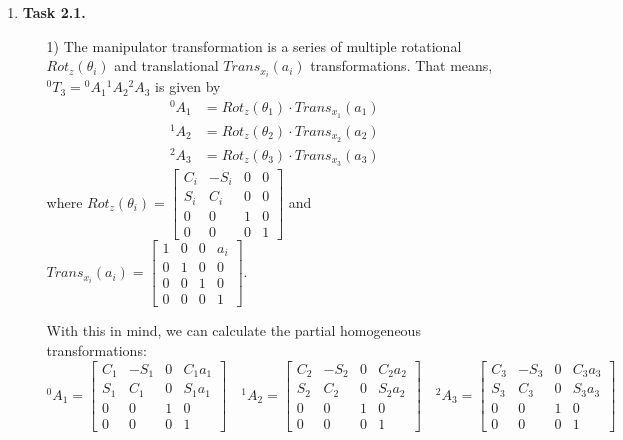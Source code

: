 \documentclass[a4paper,11pt]{article}
\author{\authorinfo}
\title{\titleinfo}
\date{\today}
\begin{document}
\maketitle
\begin {enumerate}
\item[\textbf{Task 2.1.}]

    \begin{enumerate}
        \item[1)] The manipulator transformation is a series of multiple rotational $Rot_z(\theta_i)$ and translational $Trans_{x_i}(a_i)$ transformations. That means, $^0T_3 = {^0A_1} {^1A_2} {^2A_3}$ is given by
            \begin{align*}
                ^0A_1 &= Rot_z(\theta_1) \cdot Trans_{x_1}(a_1)\\
                ^1A_2 &= Rot_z(\theta_2) \cdot Trans_{x_2}(a_2)\\
                ^2A_3 &= Rot_z(\theta_3) \cdot Trans_{x_3}(a_3)
            \end{align*}
            where $Rot_z(\theta_i) = \begin{bmatrix}
                C_i & -S_i & 0 & 0\\
                S_i & C_i & 0 & 0\\
                0 & 0 & 1 & 0\\
                0 & 0 & 0 & 1
            \end{bmatrix}$
            and
            $Trans_{x_i}(a_i) = \begin{bmatrix}
                1 & 0 & 0 & a_i\\
                0 & 1 & 0 & 0\\
                0 & 0 & 1 & 0\\
                0 & 0 & 0 & 1
            \end{bmatrix}$.

            With this in mind, we can calculate the partial homogeneous transformations:
                $${^0A_1} = \begin{bmatrix} C_1 & -S_1 & 0 & C_1a_1\\ S_1 & C_1 & 0 & S_1a_1\\ 0 & 0 & 1 & 0\\ 0 & 0 & 0 & 1 \end{bmatrix} \quad
                {^1A_2} = \begin{bmatrix} C_2 & -S_2 & 0 & C_2a_2\\ S_2 & C_2 & 0 & S_2a_2\\ 0 & 0 & 1 & 0\\ 0 & 0 & 0 & 1 \end{bmatrix}\quad
                {^2A_3} = \begin{bmatrix} C_3 & -S_3 & 0 & C_3a_3\\ S_3 & C_3 & 0 & S_3a_3\\ 0 & 0 & 1 & 0\\ 0 & 0 & 0 & 1 \end{bmatrix}$$


\end{enumerate}
\end{enumerate}
\end{document}
